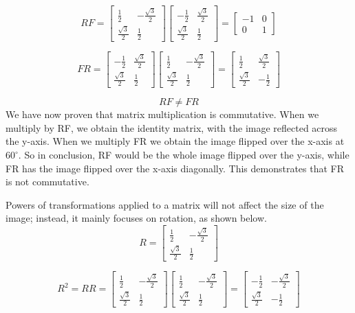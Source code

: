 \[
RF =
\begin{bmatrix}
\frac{1}{2} & -\frac{\sqrt{3}}{2} \\
\frac{\sqrt{3}}{2} & \frac{1}{2}
\end{bmatrix}
\begin{bmatrix}
-\frac{1}{2} & \frac{\sqrt{3}}{2} \\
\frac{\sqrt{3}}{2} & \frac{1}{2}
\end{bmatrix}
=
\begin{bmatrix}
-1 & 0 \\
0 & 1
\end{bmatrix}
\]

\[
FR =
\begin{bmatrix}
-\frac{1}{2} & \frac{\sqrt{3}}{2} \\
\frac{\sqrt{3}}{2} & \frac{1}{2}
\end{bmatrix}
\begin{bmatrix}
\frac{1}{2} & -\frac{\sqrt{3}}{2} \\
\frac{\sqrt{3}}{2} & \frac{1}{2}
\end{bmatrix}
=
\begin{bmatrix}
\frac{1}{2} & \frac{\sqrt{3}}{2} \\
\frac{\sqrt{3}}{2} & -\frac{1}{2}
\end{bmatrix}
\]

\[
RF \neq FR
\]
We have now proven that matrix multiplication is commutative. When we multiply by RF, we obtain the identity matrix, with the image reflected across the y-axis. When we multiply FR we obtain the image flipped over the x-axis at $60^\circ$. So in conclusion, RF would be the whole image flipped over the y-axis, while FR has the image flipped over the x-axis diagonally. This demonstrates that FR is not commutative. 

Powers of transformations applied to a matrix will not affect the size of the image; instead, it mainly focuses on rotation, as shown below. 
\[
R =
\begin{bmatrix}
\frac12 & -\frac{\sqrt3}{2} \\
\frac{\sqrt3}{2} & \frac12
\end{bmatrix}
\]

\[
R^2 = RR =
\begin{bmatrix}
\frac12 & -\frac{\sqrt3}{2} \\
\frac{\sqrt3}{2} & \frac12
\end{bmatrix}
\begin{bmatrix}
\frac12 & -\frac{\sqrt3}{2} \\
\frac{\sqrt3}{2} & \frac12
\end{bmatrix}
=
\begin{bmatrix}
-\frac12 & -\frac{\sqrt3}{2} \\
\frac{\sqrt3}{2} & -\frac12
\end{bmatrix}
\]

